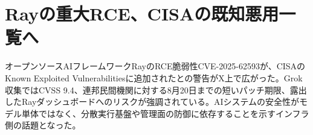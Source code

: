 \section{Rayの重大RCE、CISAの既知悪用一覧へ}
オープンソースAIフレームワークRayのRCE脆弱性CVE-2025-62593が、CISAのKnown Exploited Vulnerabilitiesに追加されたとの警告がX上で広がった。Grok収集ではCVSS 9.4、連邦民間機関に対する8月20日までの短いパッチ期限、露出したRayダッシュボードへのリスクが強調されている。AIシステムの安全性がモデル単体ではなく、分散実行基盤や管理面の防御に依存することを示すインフラ側の話題となった。
